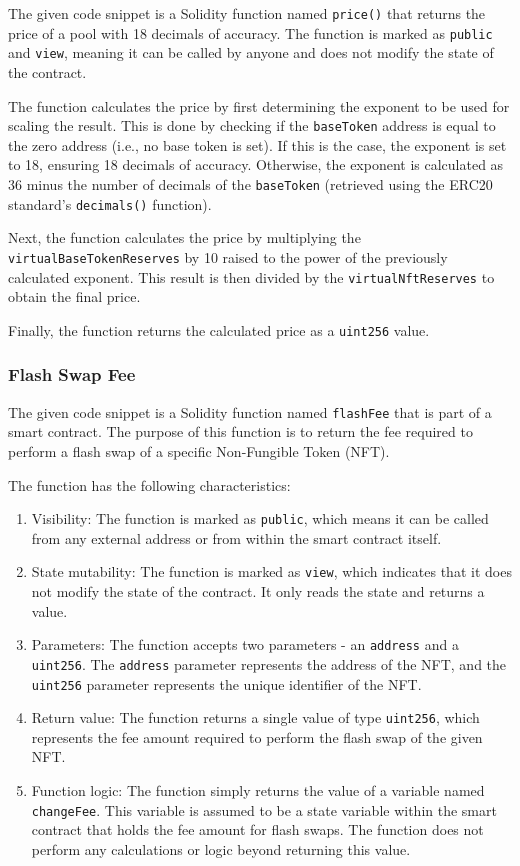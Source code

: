 The given code snippet is a Solidity function named \texttt{price()}
that returns the price of a pool with 18 decimals of accuracy. The
function is marked as \texttt{public} and \texttt{view}, meaning it can
be called by anyone and does not modify the state of the contract.

The function calculates the price by first determining the exponent to
be used for scaling the result. This is done by checking if the
\texttt{baseToken} address is equal to the zero address (i.e., no base
token is set). If this is the case, the exponent is set to 18, ensuring
18 decimals of accuracy. Otherwise, the exponent is calculated as 36
minus the number of decimals of the \texttt{baseToken} (retrieved using
the ERC20 standard's \texttt{decimals()} function).

Next, the function calculates the price by multiplying the
\texttt{virtualBaseTokenReserves} by 10 raised to the power of the
previously calculated exponent. This result is then divided by the
\texttt{virtualNftReserves} to obtain the final price.

Finally, the function returns the calculated price as a \texttt{uint256}
value.

\hypertarget{flash-swap-fee}{%
\subsubsection{Flash Swap Fee}\label{flash-swap-fee}}

The given code snippet is a Solidity function named \texttt{flashFee}
that is part of a smart contract. The purpose of this function is to
return the fee required to perform a flash swap of a specific
Non-Fungible Token (NFT).

The function has the following characteristics:

\begin{enumerate}
\def\labelenumi{\arabic{enumi}.}
\item
  Visibility: The function is marked as \texttt{public}, which means it
  can be called from any external address or from within the smart
  contract itself.
\item
  State mutability: The function is marked as \texttt{view}, which
  indicates that it does not modify the state of the contract. It only
  reads the state and returns a value.
\item
  Parameters: The function accepts two parameters - an \texttt{address}
  and a \texttt{uint256}. The \texttt{address} parameter represents the
  address of the NFT, and the \texttt{uint256} parameter represents the
  unique identifier of the NFT.
\item
  Return value: The function returns a single value of type
  \texttt{uint256}, which represents the fee amount required to perform
  the flash swap of the given NFT.
\item
  Function logic: The function simply returns the value of a variable
  named \texttt{changeFee}. This variable is assumed to be a state
  variable within the smart contract that holds the fee amount for flash
  swaps. The function does not perform any calculations or logic beyond
  returning this value.
\end{enumerate}

